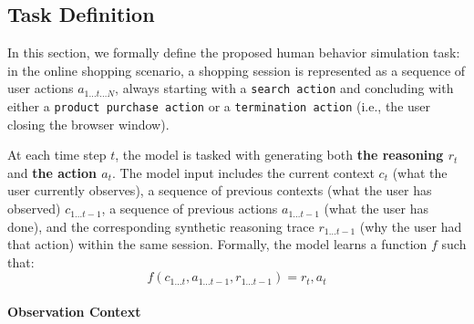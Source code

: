 \documentclass{article} %
\begin{document}
\subsection{Task Definition}  

In this section, we formally define the proposed human behavior simulation task: in the online shopping scenario,  a shopping session is represented as a sequence of user actions $a_{1 \dots t \dots N}$, always starting with a \texttt{search action} and concluding with either a \texttt{product purchase action} or a \texttt{termination action} (i.e., the user closing the browser window).  

At each time step \( t \), the model is tasked with generating both \textbf{the reasoning \( r_t \)} and \textbf{the  action \( a_t \)}. The model input includes the current context \( c_t \) (what the user currently observes), a sequence of previous contexts (what the user has observed) \( c_{1 \dots t-1} \), a sequence of previous actions \( a_{1 \dots t-1} \) (what the user has done), and the corresponding synthetic reasoning trace \( r_{1 \dots t-1} \) (why the user had that action) within the same session. Formally, the model learns a function \( f \) such that:  
\[
    f(c_{1 \dots t}, a_{1 \dots t-1}, r_{1 \dots t-1}) = r_t, a_t
\]


\paragraph{Observation Context}


\end{document}
